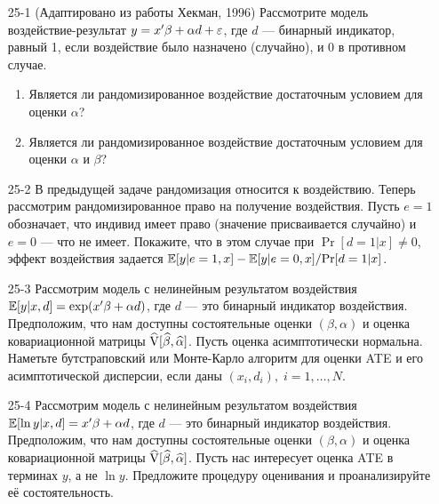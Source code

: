 \begin{enumerate}
\item[25-1] (Адаптировано из работы Хекман, 1996) Рассмотрите модель воздействие-результат $y = x' \beta +\alpha d + \varepsilon$, где $d$ --- бинарный индикатор, равный 1, если воздействие было назначено (случайно), и 0 в противном случае.
\begin{enumerate}
\item Является ли рандомизированное воздействие достаточным условием для оценки $\alpha$? 
\item Является ли рандомизированное воздействие достаточным условием для оценки $\alpha$ и $\beta$? 
\end{enumerate}

\item[25-2] В предыдущей задаче рандомизация относится к воздействию. Теперь рассмотрим рандомизированное право на получение воздействия. Пусть $e = 1$ обозначает, что индивид имеет право (значение присваивается случайно) и $e = 0$ --- что не имеет. Покажите, что в этом случае при $\Pr [d = 1 | x] \ne 0$, эффект воздействия задается $\mathbb{E} [y | e = 1, x] - \mathbb{E} [y | e = 0, x]/\mathrm{Pr}[d = 1|x]$.

\item[25-3] Рассмотрим модель с нелинейным результатом воздействия $\mathbb{E} [y|x,d] = \exp (x'\beta + \alpha d)$, где $d$ --- это бинарный индикатор воздействия. Предположим, что нам доступны состоятельные оценки $(\beta, \alpha)$ и оценка ковариационной матрицы $\widehat {\mathrm{V}} [\widehat{\beta}, \widehat{\alpha}]$. Пусть оценка асимптотически нормальна. Наметьте бутстраповский или Монте-Карло алгоритм для оценки ATE и его асимптотической дисперсии, если даны $(x_i , d_i), \; i = 1, \dots, N$. 

\item[25-4] Рассмотрим модель с нелинейным результатом воздействия $\mathbb{E} [\ln y|x,d] = x'\beta + \alpha d$, где $d$ --- это бинарный индикатор воздействия. Предположим, что нам доступны состоятельные оценки $(\beta, \alpha)$ и оценка ковариационной матрицы $\widehat {\mathrm{V}} [\widehat{\beta}, \widehat{\alpha}]$. Пусть нас интересует оценка ATE в терминах $y$, а не $\ln y$. Предложите процедуру оценивания и проанализируйте её состоятельность. 


\end{enumerate}
